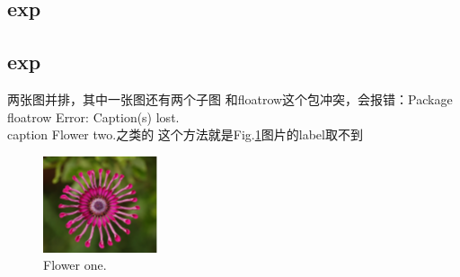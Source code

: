 \documentclass{article}
\begin{document}
\begin{CJK}{UTF8}{gbsn}
	

	
\section{exp}
\subsection{exp}

两张图并排，其中一张图还有两个子图
和floatrow这个包冲突，会报错：Package floatrow Error: Caption(s) lost. \\caption Flower two.之类的
这个方法就是Fig.\ref{fig:my_flower1}图片的label取不到
\begin{figure}[!h]
	\setlength{\abovecaptionskip}{0pt}
	\setlength{\belowcaptionskip}{0pt}
	\centering
	\begin{minipage}[b]{0.4\textwidth}
		\includegraphics[width=\textwidth]{imgs/flower1.png}
		\caption{Flower one.}
		\label{fig:my_flower1}  %
	\end{minipage}
	\hfill %
	\begin{minipage}[b]{0.55\textwidth}
\end{minipage}
\end{figure}
\end{CJK}
\end{document}
